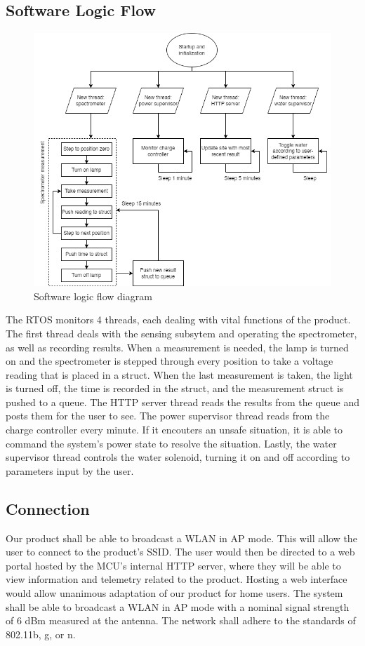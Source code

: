 \documentclass[journal]{IEEEtran}
\begin{document}
\subsection{Software Logic Flow} 
\begin{figure}[H]
    \centering
    \label{fig:logic-flow}
    \includegraphics[width=\linewidth]{images/logic-flow.png}
    \caption{Software logic flow diagram}
\end{figure}

The RTOS monitors 4 threads, each dealing with vital functions of the product. The first thread deals with the sensing subsytem and operating the spectrometer, as well as recording results. When a measurement is needed, the lamp is turned on and the spectrometer is stepped through every position to take a voltage reading that is placed in a struct. When the last measurement is taken, the light is turned off, the time is recorded in the struct, and the measurement struct is pushed to a queue. The HTTP server thread reads the results from the queue and posts them for the user to see. The power supervisor thread reads from the charge controller every minute. If it encouters an unsafe situation, it is able to command the system's power state to resolve the situation. Lastly, the water supervisor thread controls the water solenoid, turning it on and off according to parameters input by the user.

\subsection{Connection}
Our product shall be able to broadcast a WLAN in AP mode. This will allow the user to connect to the product's SSID. The user would then be directed to a web portal hosted by the MCU's internal HTTP server, where they will be able to view information and telemetry related to the product. Hosting a web interface would allow unanimous adaptation of our product for home users. The system shall be able to broadcast a WLAN in AP mode with a nominal signal strength of 6 dBm measured at the antenna. The network shall adhere to the standards of 802.11b, g, or n.
\end{document}
